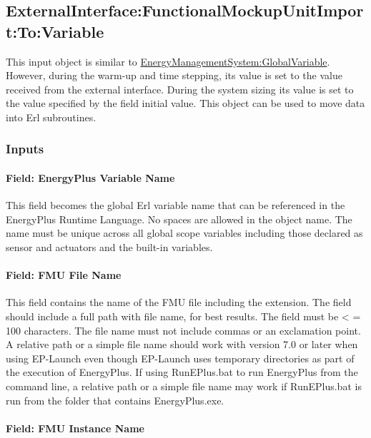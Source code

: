 \subsection{ExternalInterface:FunctionalMockupUnitImport:To:Variable}\label{externalinterfacefunctionalmockupunitimporttovariable}

This input object is similar to \hyperref[energymanagementsystemglobalvariable]{EnergyManagementSystem:GlobalVariable}. However, during the warm-up and time stepping, its value is set to the value received from the external interface. During the system sizing its value is set to the value specified by the field initial value. This object can be used to move data into Erl subroutines.

\subsubsection{Inputs}\label{inputs-8-007}

\paragraph{Field: EnergyPlus Variable Name}\label{field-energyplus-variable-name-3}

This field becomes the global Erl variable name that can be referenced in the EnergyPlus Runtime Language. No spaces are allowed in the object name. The name must be unique across all global scope variables including those declared as sensor and actuators and the built-in variables.

\paragraph{Field: FMU File Name}\label{field-fmu-file-name-4}

This field contains the name of the FMU file including the extension. The field should include a full path with file name, for best results. The field must be \textless{} = 100 characters. The file name must not include commas or an exclamation point. A relative path or a simple file name should work with version 7.0 or later when using EP-Launch even though EP-Launch uses temporary directories as part of the execution of EnergyPlus. If using RunEPlus.bat to run EnergyPlus from the command line, a relative path or a simple file name may work if RunEPlus.bat is run from the folder that contains EnergyPlus.exe.

\paragraph{Field: FMU Instance Name}\label{field-fmu-instance-name-3}

